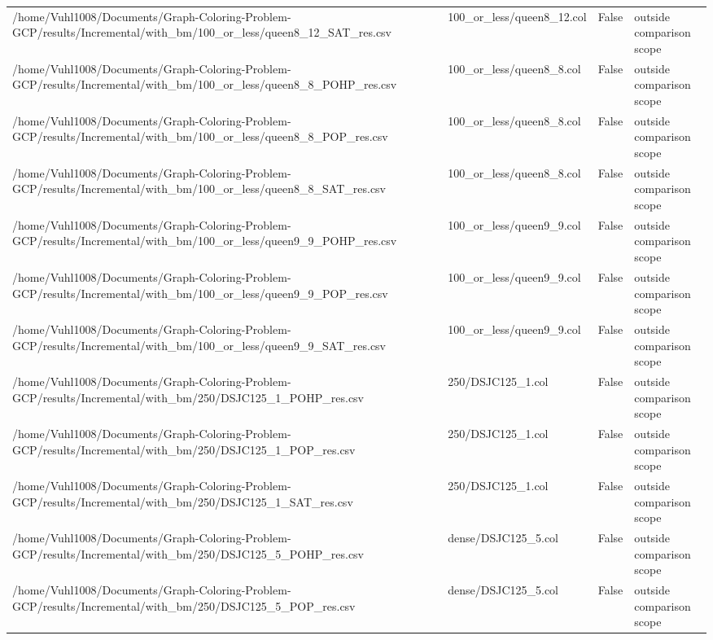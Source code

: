 \begin{table}[htbp]
\begin{tabular}{llll}
/home/Vuhl1008/Documents/Graph-Coloring-Problem-GCP/results/Incremental/with\_bm/100\_or\_less/queen8\_12\_SAT\_res.csv & 100\_or\_less/queen8\_12.col & False & outside comparison scope \\
/home/Vuhl1008/Documents/Graph-Coloring-Problem-GCP/results/Incremental/with\_bm/100\_or\_less/queen8\_8\_POHP\_res.csv & 100\_or\_less/queen8\_8.col & False & outside comparison scope \\
/home/Vuhl1008/Documents/Graph-Coloring-Problem-GCP/results/Incremental/with\_bm/100\_or\_less/queen8\_8\_POP\_res.csv & 100\_or\_less/queen8\_8.col & False & outside comparison scope \\
/home/Vuhl1008/Documents/Graph-Coloring-Problem-GCP/results/Incremental/with\_bm/100\_or\_less/queen8\_8\_SAT\_res.csv & 100\_or\_less/queen8\_8.col & False & outside comparison scope \\
/home/Vuhl1008/Documents/Graph-Coloring-Problem-GCP/results/Incremental/with\_bm/100\_or\_less/queen9\_9\_POHP\_res.csv & 100\_or\_less/queen9\_9.col & False & outside comparison scope \\
/home/Vuhl1008/Documents/Graph-Coloring-Problem-GCP/results/Incremental/with\_bm/100\_or\_less/queen9\_9\_POP\_res.csv & 100\_or\_less/queen9\_9.col & False & outside comparison scope \\
/home/Vuhl1008/Documents/Graph-Coloring-Problem-GCP/results/Incremental/with\_bm/100\_or\_less/queen9\_9\_SAT\_res.csv & 100\_or\_less/queen9\_9.col & False & outside comparison scope \\
/home/Vuhl1008/Documents/Graph-Coloring-Problem-GCP/results/Incremental/with\_bm/250/DSJC125\_1\_POHP\_res.csv & 250/DSJC125\_1.col & False & outside comparison scope \\
/home/Vuhl1008/Documents/Graph-Coloring-Problem-GCP/results/Incremental/with\_bm/250/DSJC125\_1\_POP\_res.csv & 250/DSJC125\_1.col & False & outside comparison scope \\
/home/Vuhl1008/Documents/Graph-Coloring-Problem-GCP/results/Incremental/with\_bm/250/DSJC125\_1\_SAT\_res.csv & 250/DSJC125\_1.col & False & outside comparison scope \\
/home/Vuhl1008/Documents/Graph-Coloring-Problem-GCP/results/Incremental/with\_bm/250/DSJC125\_5\_POHP\_res.csv & dense/DSJC125\_5.col & False & outside comparison scope \\
/home/Vuhl1008/Documents/Graph-Coloring-Problem-GCP/results/Incremental/with\_bm/250/DSJC125\_5\_POP\_res.csv & dense/DSJC125\_5.col & False & outside comparison scope \\

\end{tabular}
\end{table}
